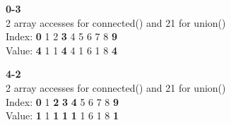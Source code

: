\documentclass{article}
\begin{document}
\textbf{0-3}\\
2 array accesses for connected() and 21 for union()\\
Index: \hspace{4pt}\textbf{0} \hspace{4pt}1 \hspace{4pt}2 \hspace{4pt}\textbf{3} \hspace{4pt}4 \hspace{4pt}5 \hspace{4pt}6 \hspace{4pt}7 \hspace{4pt}8 \hspace{4pt}\textbf{9}\\
Value: \hspace{4pt}\textbf{4} \hspace{4pt}1 \hspace{4pt}1 \hspace{4pt}\textbf{4} \hspace{4pt}4 \hspace{4pt}1 \hspace{4pt}6 \hspace{4pt}1 \hspace{4pt}8 \hspace{4pt}\textbf{4}

\textbf{4-2}\\
2 array accesses for connected() and 21 for union()\\
Index: \hspace{4pt}\textbf{0} \hspace{4pt}1 \hspace{4pt}\textbf{2} \hspace{4pt}\textbf{3} \hspace{4pt}\textbf{4} \hspace{4pt}5 \hspace{4pt}6 \hspace{4pt}7 \hspace{4pt}8 \hspace{4pt}\textbf{9}\\
Value: \hspace{4pt}\textbf{1} \hspace{4pt}1 \hspace{4pt}\textbf{1} \hspace{4pt}\textbf{1} \hspace{4pt}\textbf{1} \hspace{4pt}1 \hspace{4pt}6 \hspace{4pt}1 \hspace{4pt}8 \hspace{4pt}\textbf{1}
\end{document}
